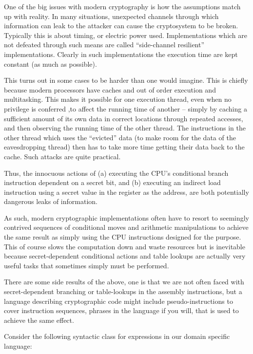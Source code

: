 
One of the big issues with modern cryptography is how the assumptions
match up with reality. In many situations, unexpected channels
through which information can leak to the attacker can cause the
cryptosystem to be broken. Typically this is about timing, or
electric power used. Implementations which are not defeated through
such means are called ``side-channel resilient'' implementations.
Clearly in such implementations the execution time are kept constant
(as much as possible).

This turns out in some cases to be harder than one would imagine.
This is chiefly because modern processors have caches and out of order
execution and multitasking. This makes it possible for one execution
thread, even when no privilege is conferred ,to affect the running
time of another -- simply by caching a sufficient amount of its own
data in correct locations through repeated accesses, and then
observing the running time of the other thread. The instructions in
the other thread which uses the ``evicted'' data (to make room for the
data of the eavesdropping thread) then has to take more time getting
their data back to the cache. Such attacks are quite practical.

Thus, the innocuous actions of (a) executing the CPU's conditional
branch instruction dependent on a secret bit, and (b) executing an
indirect load instruction using a secret value in the register as the
address, are both potentially dangerous leaks of information.

As such, modern cryptographic implementations often have to resort to
seemingly contrived sequences of conditional moves and arithmetic
manipulations to achieve the same result as simply using the CPU
instructions designed for the purpose. This of course slows the
computation down and waste resources but is inevitable because
secret-dependent conditional actions and table lookups are actually
very useful tasks that sometimes simply must be performed.

There are some side results of the above, one is that we are not often
faced with secret-dependent branching or table-lookups in the assembly
instructions, but a language describing cryptographic code might
include pseudo-instructions to cover instruction sequences, phrases in
the language if you will, that is used to achieve the same effect.

Consider the following syntactic class for expressions in our domain
specific language:

